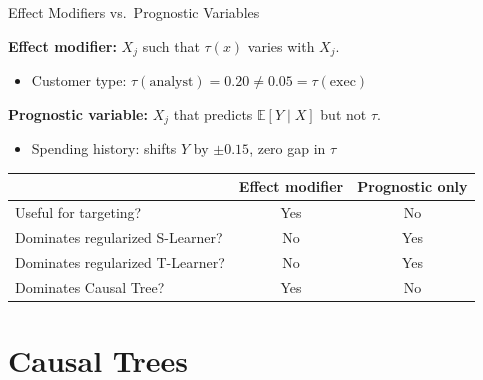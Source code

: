 \documentclass[aspectratio=169, 11pt, handout]{beamer}
\newcommand{\E}{\mathbb{E}}
\begin{document}
\begin{frame}{Effect Modifiers vs.\ Prognostic Variables}
 
\textbf{Effect modifier:} $X_j$ such that $\tau(x)$ varies with $X_j$.
\begin{itemize}
    \item Customer type: $\tau(\text{analyst}) = 0.20 \neq 0.05 = \tau(\text{exec})$
\end{itemize}
 
\bigskip
 
\textbf{Prognostic variable:} $X_j$ that predicts $\E[Y \mid X]$ but not $\tau$.
\begin{itemize}
    \item Spending history: shifts $Y$ by $\pm 0.15$, zero gap in $\tau$
\end{itemize}
 
\pause
\bigskip
 
\begin{center}
\begin{tabular}{lcc}
\toprule
& \textbf{Effect modifier} & \textbf{Prognostic only} \\
\midrule
Useful for targeting? & \textcolor{sbgreen}{Yes} & \textcolor{warnred}{No} \\
Dominates regularized S-Learner? & \textcolor{warnred}{No} & \textcolor{warnred}{Yes} \\
Dominates regularized T-Learner? & \textcolor{warnred}{No} & \textcolor{warnred}{Yes} \\
Dominates Causal Tree? & \textcolor{sbgreen}{Yes} & \textcolor{sbgreen}{No} \\
\bottomrule
\end{tabular}
\end{center}
 
\end{frame}
 
 
\section{Causal Trees}
 
\end{document}
